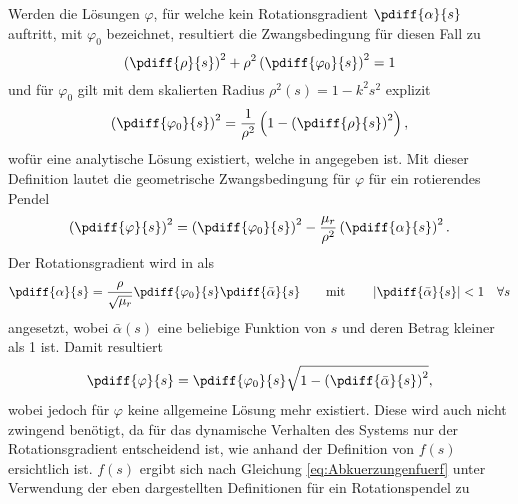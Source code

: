Werden die Lösungen $\varphi$, für welche kein Rotationsgradient $\pdiff{\alpha}{s}$ auftritt, mit $\varphi_0$ bezeichnet, 
resultiert die Zwangsbedingung für diesen Fall zu
\begin{equation}
		\left(\pdiff{\rho}{s}\right)^2 +  \rho^2 \left(\pdiff{\varphi_0}{s}\right)^2  = 1
				\label{eq:AnhTautochronerAbsorberentwurfGeomZwangsbedRotPendelOhneRot}
\end{equation}
und für $\varphi_0$ gilt mit dem skalierten Radius $\rho^2(s) = 1 - k^2 s^2$ explizit
\begin{equation}
		\left(\pdiff{\varphi_0}{s}\right)^2  = \frac{1}{\rho^2}  \left(   1 - \left(\pdiff{\rho}{s}\right)^2    \right),
				\label{eq:AnhTautochronerAbsorberentwurfGeomZwangsbedDefPhi0}
\end{equation}
wofür eine analytische Lösung existiert, welche in \cite{Mayet:Tautochronic} angegeben ist.
%
%
%
%
Mit dieser Definition lautet die geometrische Zwangsbedingung für $\varphi$ für ein rotierendes Pendel
\begin{equation}
		\left(\pdiff{\varphi}{s}\right)^2  =  \left(\pdiff{\varphi_0}{s}\right)^2     -   \frac{\mu_r}{\rho^2} \left(\pdiff{\alpha}{s}\right)^2.   
				\label{eq:AnhTautochronerAbsorberentwurfGeomZwangsbedDefPhi}
\end{equation}
%
%
%
Der Rotationsgradient wird in \cite{Mayet:Tautochronic} als
\begin{equation}
		\pdiff{\alpha}{s}  = \frac{\rho}{\sqrt{\mu_r}}   \pdiff{\varphi_0}{s} \pdiff{\bar{\alpha}}{s}   
		\qquad \text{mit} \qquad 			  \left| \pdiff{\bar{\alpha}}{s} \right|  < 1 \quad \forall s
				\label{eq:AnhTautochronerAbsorberentwurfAnsatzRotationsgradient}
\end{equation}
%
angesetzt, wobei $\bar{\alpha}(s)$ eine beliebige Funktion von $s$ und deren Betrag kleiner als 1 ist. Damit resultiert
\begin{equation}
		\pdiff{\varphi}{s} =  \pdiff{\varphi_0}{s}  \sqrt{  1 - \left(\pdiff{\bar{\alpha}}{s}\right)^2  },
				\label{eq:AnhTautochronerAbsorberentwurfGeomZwangsbedDefPhiMitSpezAlpha}
\end{equation}
%
wobei jedoch für $\varphi$ keine allgemeine Lösung mehr existiert. Diese wird auch nicht zwingend benötigt, da für das dynamische Verhalten des Systems nur der Rotationsgradient entscheidend ist, wie anhand der Definition von $f(s)$ ersichtlich ist. 
$f(s)$ ergibt sich nach Gleichung 	\eqref{eq:Abkuerzungenfuerf} unter Verwendung der eben dargestellten Definitionen   für ein Rotationspendel zu
